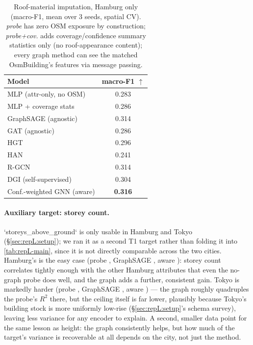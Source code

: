 \begin{table}[t]
  \centering
  \caption{Roof-material imputation, Hamburg only (macro-F1, mean over 3
  seeds, spatial CV). \emph{probe} has zero OSM exposure by construction;
  \emph{probe+cov.} adds coverage/confidence summary statistics only (no
  roof-appearance content); every graph method can see the matched
  OsmBuilding's features via message passing.}
  \label{tab:repL-roofmat}
  \small\setlength{\tabcolsep}{4pt}
  \begin{tabular}{@{}lc@{}}
    \toprule
    Model & macro-F1 $\uparrow$\\
    \midrule
    MLP (attr-only, no OSM)      & 0.283\\
    MLP + coverage stats         & 0.286\\
    GraphSAGE (agnostic)         & 0.314\\
    GAT (agnostic)                & 0.286\\
    HGT                          & 0.296\\
    HAN                          & 0.241\\
    R-GCN                       & 0.314\\
    DGI (self-supervised)        & 0.304\\
    Conf.-weighted GNN (aware)   & \textbf{0.316}\\
    \bottomrule
  \end{tabular}
\end{table}

\paragraph{Auxiliary target: storey count.} `storeys\_above\_ground` is only
usable in Hamburg and Tokyo (\S\ref{sec:repL:setup}); we ran it as a second T1
target rather than folding it into \cref{tab:repL-main}, since it is not
directly comparable across the two cities. Hamburg's is the easy case (probe
, GraphSAGE , aware ): storey count correlates
tightly enough with the other Hamburg attributes that even the no-graph probe
does well, and the graph adds a further, consistent gain. Tokyo is markedly
harder (probe , GraphSAGE , aware ) --- the
graph roughly quadruples the probe's $R^2$ there, but the ceiling itself is far
lower, plausibly because Tokyo's building stock is more uniformly low-rise
(\S\ref{sec:repL:setup}'s schema survey), leaving less variance for any
encoder to explain. A second, smaller data point for the same lesson as height:
the graph consistently helps, but how much of the target's variance is
recoverable at all depends on the city, not just the method.

